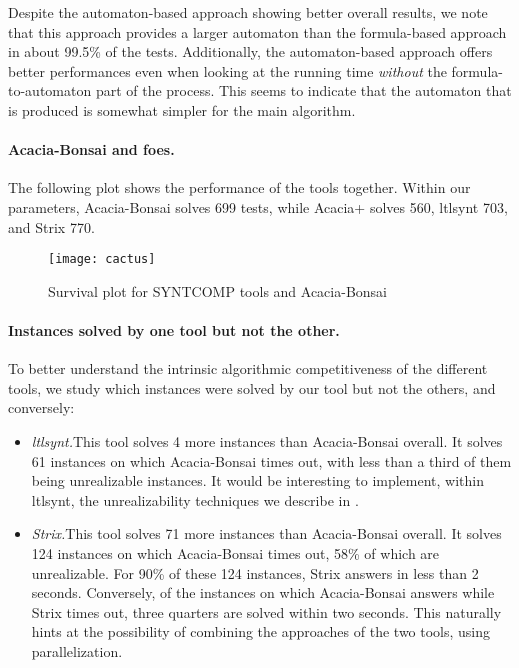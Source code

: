 \documentclass[runningheads,a4paper]{llncs}
\begin{document}
\begin{compactitem}
  Despite the automaton-based approach showing better overall results, we note
  that this approach provides a larger automaton than the formula-based approach
  in about 99.5\% of the tests.  Additionally, the automaton-based approach
  offers better performances even when looking at the running time
  \emph{without} the formula-to-automaton part of the process.  This seems to
  indicate that the automaton that is produced is somewhat simpler for the main
  algorithm.
\end{compactitem}

\paragraph{Acacia-Bonsai and foes.}  The following plot shows the performance of
the tools together.  Within our parameters, Acacia-Bonsai solves 699 tests,
while Acacia+ solves 560, ltlsynt 703, and Strix 770.

\begin{figure}[h!]
  \centering
  \texttt{[image: cactus]}
  \caption{Survival plot for SYNTCOMP tools and Acacia-Bonsai}
  \label{fig:cactus}
\end{figure}

\paragraph{Instances solved by one tool but not the other.}  To better
understand the intrinsic algorithmic competitiveness of the different tools, we
study which instances were solved by our tool but not the others, and conversely:
\begin{itemize}
\item \emph{ltlsynt.}\quad This tool solves 4 more instances than Acacia-Bonsai
  overall.  It solves 61 instances on which Acacia-Bonsai times out, with less
  than a third of them being unrealizable instances.  It would be interesting to
  implement, within ltlsynt, the unrealizability techniques we describe in
  .
\item \emph{Strix.}\quad This tool solves 71 more instances than Acacia-Bonsai
  overall.  It solves 124 instances on which Acacia-Bonsai times out, 58\% of
  which are unrealizable.  For 90\% of these 124 instances, Strix answers in
  less than 2 seconds.  Conversely, of the instances on which Acacia-Bonsai
  answers while Strix times out, three quarters are solved within two seconds.
  This naturally hints at the possibility of combining the approaches of the two
  tools, using parallelization.
\end{itemize}
\end{document}
